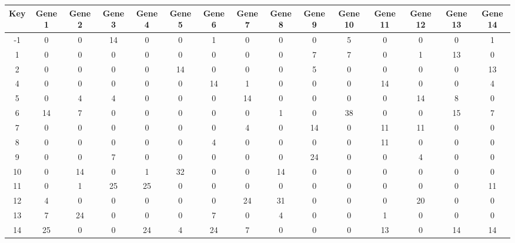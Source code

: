 \begin{tabular}{|c|c|c|c|c|c|c|c|c|c|c|c|c|c|c|}
\hline
Key & Gene 1 & Gene 2 & Gene 3 & Gene 4 & Gene 5 & Gene 6 & Gene 7 & Gene 8 & Gene 9 & Gene 10 & Gene 11 & Gene 12 & Gene 13 & Gene 14 \\
\hline
-1 & 0 & 0 & 14 & 0 & 0 & 1 & 0 & 0 & 0 & 5 & 0 & 0 & 0 & 1 \\
1 & 0 & 0 & 0 & 0 & 0 & 0 & 0 & 0 & 7 & 7 & 0 & 1 & 13 & 0 \\
2 & 0 & 0 & 0 & 0 & 14 & 0 & 0 & 0 & 5 & 0 & 0 & 0 & 0 & 13 \\
4 & 0 & 0 & 0 & 0 & 0 & 14 & 1 & 0 & 0 & 0 & 14 & 0 & 0 & 4 \\
5 & 0 & 4 & 4 & 0 & 0 & 0 & 14 & 0 & 0 & 0 & 0 & 14 & 8 & 0 \\
6 & 14 & 7 & 0 & 0 & 0 & 0 & 0 & 1 & 0 & 38 & 0 & 0 & 15 & 7 \\
7 & 0 & 0 & 0 & 0 & 0 & 0 & 4 & 0 & 14 & 0 & 11 & 11 & 0 & 0 \\
8 & 0 & 0 & 0 & 0 & 0 & 4 & 0 & 0 & 0 & 0 & 11 & 0 & 0 & 0 \\
9 & 0 & 0 & 7 & 0 & 0 & 0 & 0 & 0 & 24 & 0 & 0 & 4 & 0 & 0 \\
10 & 0 & 14 & 0 & 1 & 32 & 0 & 0 & 14 & 0 & 0 & 0 & 0 & 0 & 0 \\
11 & 0 & 1 & 25 & 25 & 0 & 0 & 0 & 0 & 0 & 0 & 0 & 0 & 0 & 11 \\
12 & 4 & 0 & 0 & 0 & 0 & 0 & 24 & 31 & 0 & 0 & 0 & 20 & 0 & 0 \\
13 & 7 & 24 & 0 & 0 & 0 & 7 & 0 & 4 & 0 & 0 & 1 & 0 & 0 & 0 \\
14 & 25 & 0 & 0 & 24 & 4 & 24 & 7 & 0 & 0 & 0 & 13 & 0 & 14 & 14 \\
\hline
\end{tabular}